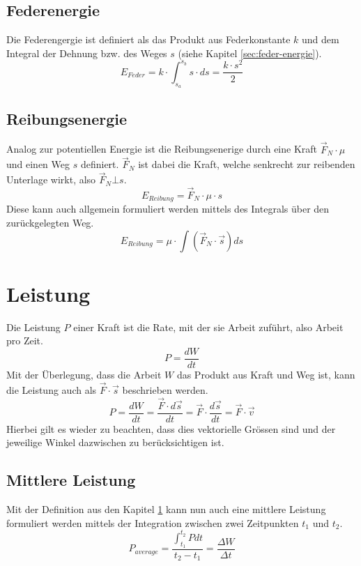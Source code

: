 \subsection{Federenergie}
Die Federengergie ist definiert als das Produkt aus Federkonstante $k$ und 
dem Integral der Dehnung bzw. des Weges $s$ 
(siehe Kapitel \ref{sec:feder-energie}).
\[ \boxed{E_{Feder} = k \cdot \int_{s_a}^{s_b} s \cdot ds = \frac{k \cdot s^2}{2}} \]

\subsection{Reibungsenergie}
Analog zur potentiellen Energie ist die Reibungsenerige durch eine Kraft
$\vec{F}_N \cdot \mu$ und einen Weg $s$ definiert. 
$\vec{F}_N$ ist dabei die Kraft, welche senkrecht zur reibenden Unterlage 
wirkt, also $\vec{F}_N \bot s$.
\[ \boxed{E_{Reibung} = \vec{F}_N \cdot \mu \cdot s} \]
Diese kann auch allgemein formuliert werden mittels des Integrals über
den zurückgelegten Weg.
\[ \boxed{
	E_{Reibung} = \mu \cdot \int \left( 
		\vec{F}_N \cdot \vec{s} \right) ds} 
\]

\section{Leistung}\label{sec:leistung}
Die Leistung $P$ einer Kraft ist die Rate, mit der sie Arbeit zuführt,
also Arbeit pro Zeit.
\[ \boxed{P = \frac{dW}{dt} } \]
Mit der Überlegung, dass die Arbeit $W$ das Produkt aus Kraft und Weg
ist, kann die Leistung auch als $\vec{F} \cdot \vec{s}$ beschrieben
werden.
\[ \boxed{
	P 
		= \frac{dW}{dt} 
		= \frac{\vec{F} \cdot d\vec{s}}{dt}
		= \vec{F} \cdot \frac{d\vec{s}}{dt} 
		= \vec{F} \cdot \vec{v}
} \]
Hierbei gilt es wieder zu beachten, dass dies vektorielle Grössen sind
und der jeweilige Winkel dazwischen zu berücksichtigen ist.

\subsection{Mittlere Leistung}
Mit der Definition aus den Kapitel \ref{sec:leistung} kann nun auch eine
mittlere Leistung formuliert werden mittels der Integration zwischen
zwei Zeitpunkten $t_1$ und $t_2$.
\[ \boxed{
	P_{average} 
		= \frac{\int_{t_1}^{t_2} P dt}{t_2 - t_1}
		= \frac{\Delta W}{\Delta t} 
} \]
